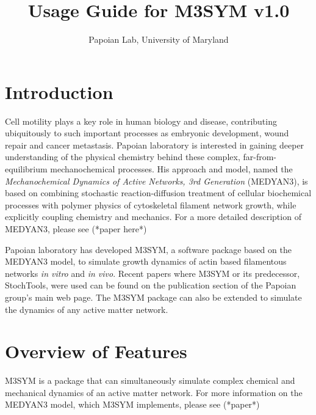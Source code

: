 \documentclass[11pt, oneside]{article}   	%
\title{Usage Guide for M3SYM v1.0}
\author{Papoian Lab, University of Maryland}
\date{}							%
\begin{document}
\maketitle



\tableofcontents

\newpage
\section {Introduction}

 Cell motility plays a key role in human biology and disease, contributing ubiquitously
 to such important processes as embryonic development, wound repair and cancer 
 metastasis. Papoian laboratory is interested in gaining deeper understanding of the
 physical chemistry behind these complex, far-from-equilibrium mechanochemical 
 processes. His approach and model, named the \textit{Mechanochemical Dynamics of Active Networks,
 3rd Generation} (MEDYAN3), is based on combining stochastic reaction-diffusion treatment
 of cellular biochemical processes with polymer physics of cytoskeletal filament network 
 growth, while explicitly coupling chemistry and mechanics. For a more detailed description of MEDYAN3, 
 please see (*paper here*)
 
 Papoian laboratory has developed M3SYM, a software package based on the MEDYAN3
 model, to simulate growth dynamics of actin based filamentous networks \textit{in vitro} and 
 \textit{in vivo}. Recent papers where M3SYM or its predecessor, StochTools, were used 
 can be found on the publication section of the Papoian group's main web page. 
 The M3SYM package can also be extended to simulate the dynamics of any active matter network.

\section {Overview of Features}

M3SYM is a package that can simultaneously simulate complex chemical and mechanical dynamics
of an active matter network. For more information on the MEDYAN3 model, which M3SYM implements,
please see (*paper*)
\end{document}
